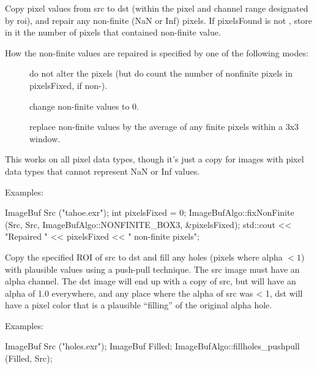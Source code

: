 Copy pixel values from {\cf src} to {\cf dst} (within the pixel and channel
range designated by {\cf roi}), and repair any non-finite ({\cf NaN} or {\cf
Inf}) pixels.  If {\cf pixelsFound} is not \NULL, store in it the number of
pixels that contained non-finite value.

How the non-finite values are repaired is specified by one of the
following modes:

\begin{description} 
\item[\spc] \spc
\item[\rm {}]   do not alter the pixels (but do count the number
                       of nonfinite pixels in {\cf *pixelsFixed}, if non-\NULL).
\item[\rm {}]  change non-finite values to 0.
\item[\rm {}]   replace non-finite values by the average of any
                     finite pixels within a 3x3 window.
\end{description}

This works on all pixel data types, though it's just a copy for images with
pixel data types that cannot represent {\cf NaN} or {\cf Inf} values.


\smallskip
\noindent Examples:
\begin{code}
    ImageBuf Src ("tahoe.exr");
    int pixelsFixed = 0;
    ImageBufAlgo::fixNonFinite (Src, Src, ImageBufAlgo::NONFINITE_BOX3,
                                &pixelsFixed);
    std::cout << "Repaired " << pixelsFixed << " non-finite pixels\n";
\end{code}
\apiend


 
Copy the specified ROI of {\cf src} to {\cf dst} and fill any 
holes (pixels where alpha $< 1$) with plausible values using a push-pull
technique.  The {\cf src} image must have
an alpha channel.  The dst image will end up with a copy of src, but
will have an alpha of 1.0 everywhere, and any place where the alpha
of src was < 1, dst will have a pixel color that is a plausible
``filling'' of the original alpha hole.

\smallskip
\noindent Examples:
\begin{code}
    ImageBuf Src ("holes.exr");
    ImageBuf Filled;
    ImageBufAlgo::fillholes_pushpull (Filled, Src);
\end{code}
\apiend



